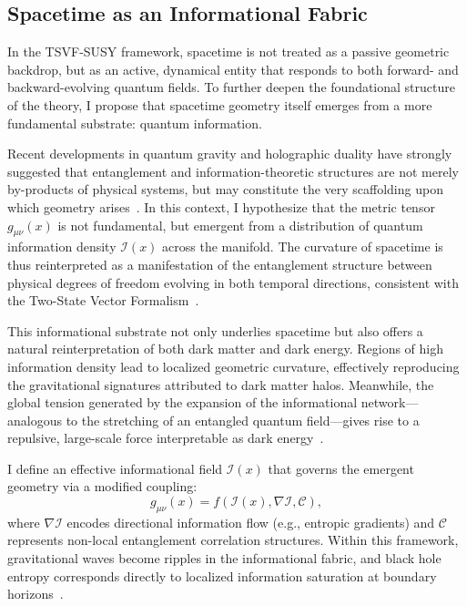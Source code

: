\documentclass[twocolumn,superscriptaddress,floatfix]{revtex4-2}
\begin{document}
\subsection{Spacetime as an Informational Fabric}
\label{sec:infofabric}

In the TSVF-SUSY framework, spacetime is not treated as a passive geometric backdrop, but as an active, dynamical entity that responds to both forward- and backward-evolving quantum fields. To further deepen the foundational structure of the theory, I propose that spacetime geometry itself emerges from a more fundamental substrate: quantum information.

Recent developments in quantum gravity and holographic duality have strongly suggested that entanglement and information-theoretic structures are not merely by-products of physical systems, but may constitute the very scaffolding upon which geometry arises~\cite{VanRaamsdonk2010, Susskind2016, Swingle2012}. In this context, I hypothesize that the metric tensor $g_{\mu\nu}(x)$ is not fundamental, but emergent from a distribution of quantum information density $\mathcal{I}(x)$ across the manifold. The curvature of spacetime is thus reinterpreted as a manifestation of the entanglement structure between physical degrees of freedom evolving in both temporal directions, consistent with the Two-State Vector Formalism~\cite{Aharonov2008, Vaidman2016}.

This informational substrate not only underlies spacetime but also offers a natural reinterpretation of both dark matter and dark energy. Regions of high information density lead to localized geometric curvature, effectively reproducing the gravitational signatures attributed to dark matter halos. Meanwhile, the global tension generated by the expansion of the informational network—analogous to the stretching of an entangled quantum field—gives rise to a repulsive, large-scale force interpretable as dark energy~\cite{Verlinde2016, Hossenfelder2017}.

I define an effective informational field $\mathcal{I}(x)$ that governs the emergent geometry via a modified coupling:
\begin{equation}
g_{\mu\nu}(x) = f(\mathcal{I}(x), \nabla \mathcal{I}, \mathcal{C}),
\label{eq:infometric}
\end{equation}
where $\nabla \mathcal{I}$ encodes directional information flow (e.g., entropic gradients) and $\mathcal{C}$ represents non-local entanglement correlation structures. Within this framework, gravitational waves become ripples in the informational fabric, and black hole entropy corresponds directly to localized information saturation at boundary horizons~\cite{Bekenstein1973, RyuTakayanagi2006}.
\end{document}
